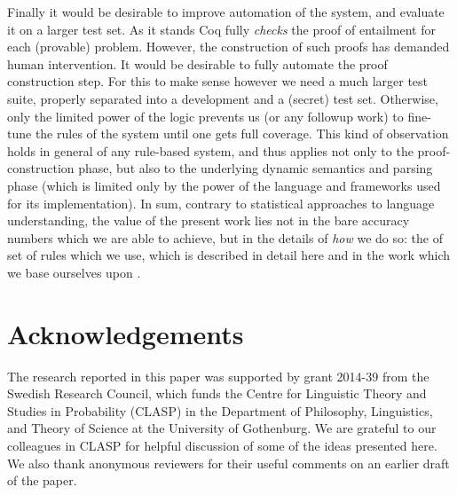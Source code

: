 \documentclass[11pt,a4paper]{article}
\newcommand\hyp{\item[H]}
\newcommand\fracasex[2]{\begin{lingex}\item[(#1)] \begin{subex} #2 \end{subex} \end{lingex} }
\begin{document}

Finally it would be desirable to improve automation of the system, and
evaluate it on a larger test set. As it stands Coq fully \emph{checks}
the proof of entailment for each (provable) problem. However, the
construction of such proofs has demanded human intervention. It would
be desirable to fully automate the proof construction step. For this
to make sense however we need a much larger test suite, properly
separated into a development and a (secret) test set. Otherwise, only
the limited power of the logic prevents us (or any followup work) to
fine-tune the rules of the system until one gets full coverage. This
kind of observation holds in general of any rule-based system, and
thus applies not only to the proof-construction phase, but also to the
underlying dynamic semantics and parsing phase (which is limited only
by the power of the language and frameworks used for its
implementation). In sum, contrary to statistical approaches to
language understanding, the value of the present work lies not in the
bare accuracy numbers which we are able to achieve, but in the details
of \emph{how} we do so: the of set of rules which we use, which is
described in detail here and in the work which we base ourselves upon
\citep{bernardy_computational_2020,bernardy_wide-coverage_2019}.

\ifanon

\else
\section*{Acknowledgements}
The research reported in this paper was supported by grant 2014-39 from the
Swedish Research Council, which funds the Centre for Linguistic Theory and
Studies in Probability (CLASP) in the Department of Philosophy, Linguistics,
and Theory of Science at the University of Gothenburg. We are grateful to
our colleagues in CLASP for helpful discussion of some of the ideas presented
here. We also thank anonymous reviewers for their useful comments on an
earlier draft of the paper.
\fi



\end{document}
